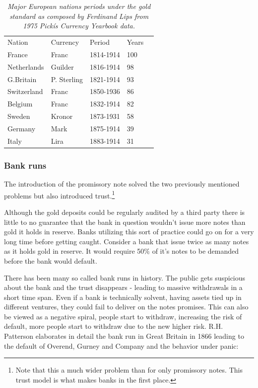 \begin{table}[!htb]
	\begin{tabular}{lllll}
		Nation & Currency & Period & Years \\
		France & Franc & 1814-1914 & 100 \\
		Netherlands & Guilder & 1816-1914 & 98 \\
		G.Britain & P. Sterling & 1821-1914 & 93 \\
		Switzerland & Franc & 1850-1936 & 86 \\
		Belgium & Franc & 1832-1914 & 82 \\
		Sweden & Kronor & 1873-1931 & 58 \\
		Germany & Mark & 1875-1914 & 39 \\
		Italy & Lira & 1883-1914 & 31 \\   
	\end{tabular}
	\caption{\textit{ Major European nations periods under the gold standard
			as composed by Ferdinand Lips\cite{lips:gold:wars} from 1975 Pickís Currency Yearbook data.
	}}
	\label{tab:gold:standard}
\end{table}

\subsubsection{Bank runs}

The introduction of the promissory note solved the two previously mentioned problems but also 
introduced trust.\footnote{Note that this a much wider problem than for only promissory notes. This trust model is what makes banks in the first place.} 

Although the gold deposits could be regularly audited by a third party there is little to no guarantee that the bank in question wouldn't issue more notes than gold it holds in reserve. Banks utilizing this sort of practice could go on for a very long time before getting caught. Consider a bank that issue twice as many notes as it holds gold in reserve. It would require 50\% of it's notes to be demanded before the bank would default.  
  
There has been many so called bank runs in history. The public gets suspicious about the bank and the trust disappears - leading to massive withdrawals in a short time span. Even if a bank is technically solvent, having assets tied up in different ventures, they could fail to deliver on the notes promises. This can also be viewed as a negative spiral, people start to withdraw, increasing the risk of default, more people start to withdraw due to the new higher risk. R.H. Patterson elaborates in detail the bank run in Great Britain in 1866 leading to the default of Overend, Gurney and Company and the behavior under panic: 

